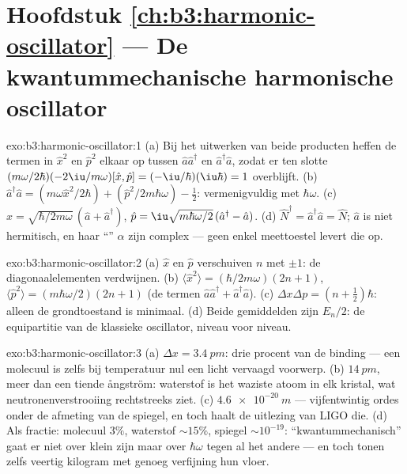 \section*{Hoofdstuk \ref{ch:b3:harmonic-oscillator} --- De kwantummechanische harmonische oscillator}

\begin{solution}{exo:b3:harmonic-oscillator:1}
(a) Bij het uitwerken van beide producten heffen de termen in $\hat x^2$ en
$\hat p^2$ elkaar op tussen $\hat a\hat a^\dagger$ en
$\hat a^\dagger\hat a$, zodat er ten slotte
$(m\omega/2\hbar)(-2\iu/m\omega)[\hat x, \hat p] =
(-\iu/\hbar)(\iu\hbar) = 1$ overblijft. (b) $\hat a^\dagger\hat a = (m\omega\hat x^2/2\hbar) +
(\hat p^2/2m\hbar\omega) - \tfrac12$: vermenigvuldig met $\hbar\omega$.
(c) $\hat x = \sqrt{\hbar/2m\omega}\,(\hat a + \hat a^\dagger)$, $\hat p
= \iu\sqrt{m\hbar\omega/2}\,(\hat a^\dagger - \hat a)$. (d) $\hat
N^\dagger = \hat a^\dagger\hat a = \hat N$; $\hat a$ is niet hermitisch,
en haar ``'' $\alpha$ zijn complex --- geen enkel meettoestel
levert die op.
\end{solution}

\begin{solution}{exo:b3:harmonic-oscillator:2}
(a) $\hat x$ en $\hat p$ verschuiven $n$ met $\pm1$: de
diagonaalelementen verdwijnen. (b) $\langle\hat x^2\rangle = (\hbar/2m\omega)(2n + 1)$, $\langle\hat p^2\rangle = (m\hbar\omega/2)(2n + 1)$ (de termen $\hat
a\hat a^\dagger + \hat a^\dagger\hat a$). (c)
$\Delta x\Delta p
= (n + \tfrac12)\hbar$: alleen de grondtoestand is
minimaal. (d) Beide gemiddelden zijn $E_n/2$: de equipartitie van de
klassieke oscillator, niveau voor niveau.
\end{solution}

\begin{solution}{exo:b3:harmonic-oscillator:3}
(a) $\Delta x = \qty{3.4}{pm}$: drie procent van de binding --- een
molecuul is zelfs bij temperatuur nul een licht vervaagd voorwerp. (b)
$\qty{14}{pm}$, meer dan een tiende ångström: waterstof is het
waziste atoom in elk kristal, wat neutronenverstrooiing rechtstreeks
ziet. (c) $\qty{4.6e-20}{m}$ --- vijfentwintig ordes onder de afmeting van
de spiegel, en toch haalt de uitlezing van LIGO die. (d) Als fractie:
molecuul $3\%$, waterstof $\sim15\%$, spiegel $\sim10^{-19}$:
``kwantummechanisch'' gaat er niet over klein zijn maar over
$\hbar\omega$ tegen al het andere --- en toch tonen zelfs veertig
kilogram met genoeg verfijning hun vloer.
\end{solution}

